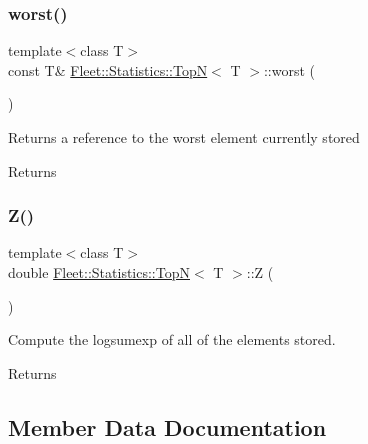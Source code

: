 \subsubsection{\texorpdfstring{worst()}{worst()}}
{\footnotesize\ttfamily template$<$class T$>$ \\
const T\& \hyperlink{class_fleet_1_1_statistics_1_1_top_n}{Fleet\+::\+Statistics\+::\+TopN}$<$ T $>$\+::worst (\begin{DoxyParamCaption}{ }\end{DoxyParamCaption})\hspace{0.3cm}{\ttfamily [inline]}}

Returns a reference to the worst element currently stored \begin{DoxyReturn}{Returns}

\end{DoxyReturn}
\mbox{\label{class_fleet_1_1_statistics_1_1_top_n_aa94e0f1e4df0ba70b35abcc540b7cb03}} 
\subsubsection{\texorpdfstring{Z()}{Z()}}
{\footnotesize\ttfamily template$<$class T$>$ \\
double \hyperlink{class_fleet_1_1_statistics_1_1_top_n}{Fleet\+::\+Statistics\+::\+TopN}$<$ T $>$\+::Z (\begin{DoxyParamCaption}{ }\end{DoxyParamCaption})\hspace{0.3cm}{\ttfamily [inline]}}

Compute the logsumexp of all of the elements stored. \begin{DoxyReturn}{Returns}

\end{DoxyReturn}


\subsection{Member Data Documentation}
\mbox{\label{class_fleet_1_1_statistics_1_1_top_n_a0f5ecded3f85aeeb85da2f2b3056b466}} 
